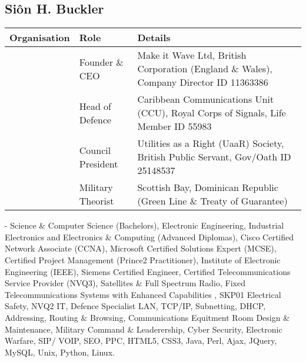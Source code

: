 \documentclass[letterpaper,10pt,english]{sphinxmanual}
\begin{document}
\subsection{Siôn H. Buckler}
\label{\detokenize{index:sion-h-buckler}}

\begin{savenotes}\sphinxattablestart
\centering
\begin{tabulary}{\linewidth}[t]{|T|T|T|}
\hline
\sphinxstyletheadfamily 
Organisation
&\sphinxstyletheadfamily 
Role
&\sphinxstyletheadfamily 
Details
\\
\hline
\noindent{}
&
Founder \& CEO
&
Make it Wave Ltd, British Corporation (England \& Wales), Company Director ID 11363386
\\
\hline
\noindent{}
&
Head of Defence
&
Caribbean Communications Unit (CCU), Royal Corps of Signals, Life Member ID 55983
\\
\hline
\noindent{}
&
Council President
&
Utilities as a Right (UaaR) Society, British Public Servant, Gov/Oath ID 25148537
\\
\hline
\noindent{}
&
Military Theorist
&
Scottish Bay, Dominican Republic (Green Line \& Treaty of Guarantee)
\\
\hline
\end{tabulary}
\par
\sphinxattableend\end{savenotes}

 - Science \& Computer Science (Bachelors), Electronic Engineering, Industrial Electronics and Electronics \& Computing (Advanced Diplomas), Cisco Certified Network Associate (CCNA), Microsoft Certified Solutions Expert (MCSE), Certified Project Management (Prince2 Practitioner), Institute of Electronic Engineering (IEEE), Siemens Certified Engineer, Certified Telecommunications Service Provider (NVQ3), Satellites \& Full Spectrum Radio, Fixed Telecommunications Systems with Enhanced Capabilities , SKP01 Electrical Safety, NVQ2 IT, Defence Specialist LAN, TCP/IP, Subnetting, DHCP, Addressing, Routing \& Browsing, Communications Equitment Room Design \& Maintenance, Military Command \& Leaderership,  Cyber Security, Electronic Warfare, SIP/ VOIP, SEO, PPC, HTML5, CSS3, Java, Perl, Ajax, JQuery, MySQL, Unix, Python, Linux.



\renewcommand{\indexname}{Index}
\printindex
\end{document}
